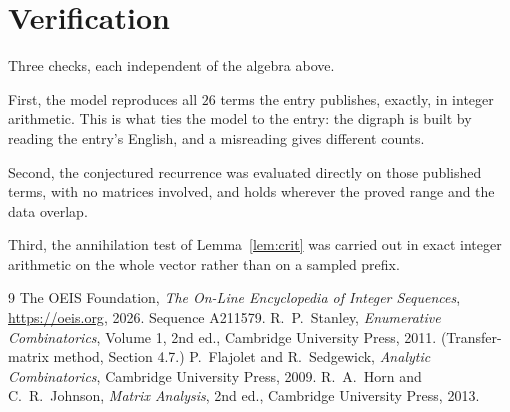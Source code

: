 \documentclass[11pt,a4paper]{article}
\theoremstyle{plain}
\theoremstyle{definition}
\begin{document}
\section{Verification}

Three checks, each independent of the algebra above.

First, the model reproduces all $26$ terms the entry publishes, exactly, in integer
arithmetic. This is what ties the model to the entry: the digraph is built by reading the
entry's English, and a misreading gives different counts.

Second, the conjectured recurrence was evaluated directly on those published terms, with no
matrices involved, and holds wherever the proved range and the data overlap.

Third, the annihilation test of Lemma~\ref{lem:crit} was carried out in exact integer
arithmetic on the whole vector rather than on a sampled prefix.

\begin{thebibliography}{9}
 The OEIS Foundation, \emph{The On-Line Encyclopedia of Integer
Sequences}, \url{https://oeis.org}, 2026. Sequence A211579.
 R.~P.~Stanley, \emph{Enumerative Combinatorics}, Volume 1, 2nd ed.,
Cambridge University Press, 2011. (Transfer-matrix method, Section 4.7.)
 P.~Flajolet and R.~Sedgewick, \emph{Analytic Combinatorics}, Cambridge
University Press, 2009.
 R.~A.~Horn and C.~R.~Johnson, \emph{Matrix Analysis}, 2nd ed., Cambridge
University Press, 2013.
\end{thebibliography}
\end{document}
